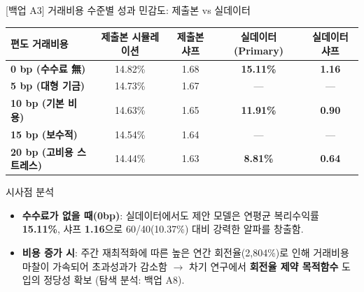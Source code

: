 \begin{frame}{[백업 A3] 거래비용 수준별 성과 민감도: 제출본 vs 실데이터}
\small
\begin{table}[H]
\centering
\begin{tabular}{lcccc}
\toprule
\textbf{편도 거래비용} & \textbf{제출본 시뮬레이션} & \textbf{제출본 샤프} & \textbf{실데이터 (Primary)} & \textbf{실데이터 샤프} \\
\midrule
\textbf{0 bp (수수료 無)} & 14.82\% & 1.68 & \textbf{15.11\%} & \textbf{1.16} \\
\textbf{5 bp (대형 기금)} & 14.73\% & 1.67 & — & — \\
\textbf{10 bp (기본 비용)} & 14.63\% & 1.65 & \textbf{11.91\%} & \textbf{0.90} \\
\textbf{15 bp (보수적)} & 14.54\% & 1.64 & — & — \\
\textbf{20 bp (고비용 스트레스)} & 14.44\% & 1.63 & \textbf{8.81\%} & \textbf{0.64} \\
\bottomrule
\end{tabular}
\end{table}

\begin{block}{시사점 분석}
  \small
  \begin{itemize}
    \item \textbf{수수료가 없을 때(0bp)}: 실데이터에서도 제안 모델은 연평균 복리수익률 \textbf{15.11\%}, 샤프 \textbf{1.16}으로 60/40(10.37\%) 대비 강력한 알파를 창출함.
    \item \textbf{비용 증가 시}: 주간 재최적화에 따른 높은 연간 회전율(2,804\%)로 인해 거래비용 마찰이 가속되어 초과성과가 감소함 $\rightarrow$ 차기 연구에서 \textbf{회전율 제약 목적함수} 도입의 정당성 확보 (탐색 분석: 백업 A8).
  \end{itemize}
\end{block}
\end{frame}

